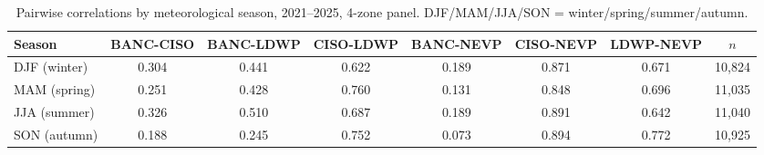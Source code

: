 \begin{table}[ht]
\centering
\small
\caption{Pairwise correlations by meteorological season, 2021--2025, 4-zone panel. DJF/MAM/JJA/SON = winter/spring/summer/autumn.}
\label{tab:season}
\setlength{\tabcolsep}{4pt}
\begin{tabular}{lccccccc}
\toprule
Season & BANC-CISO & BANC-LDWP & CISO-LDWP & BANC-NEVP & CISO-NEVP & LDWP-NEVP & $n$ \\
\midrule
DJF (winter) & 0.304 & 0.441 & 0.622 & 0.189 & 0.871 & 0.671 & 10{,}824 \\
MAM (spring) & 0.251 & 0.428 & 0.760 & 0.131 & 0.848 & 0.696 & 11{,}035 \\
JJA (summer) & 0.326 & 0.510 & 0.687 & 0.189 & 0.891 & 0.642 & 11{,}040 \\
SON (autumn) & 0.188 & 0.245 & 0.752 & 0.073 & 0.894 & 0.772 & 10{,}925 \\
\bottomrule
\end{tabular}
\end{table}
